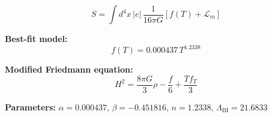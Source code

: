 
\begin{equation}
  S = \int d^4x \, |e| \, \frac{1}{16\pi G} \left[ f(T) + \mathcal{L}_m \right]
\end{equation}

\textbf{Best-fit model:}
\begin{equation}
  f(T) = 0.000437 \, T^{1.2338}
\end{equation}

\textbf{Modified Friedmann equation:}
\begin{equation}
  H^2 = \frac{8\pi G}{3} \rho - \frac{f}{6} + \frac{T f_T}{3}
\end{equation}

\textbf{Parameters:}
$\alpha = 0.000437$, \quad
$\beta = -0.451816$, \quad
$n = 1.2338$, \quad
$\Lambda_{\text{BI}} = 21.6833$